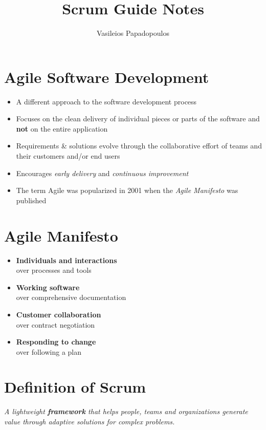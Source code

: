 \documentclass[a4paper,11pt,twocolumn]{article}
\title{\textbf{Scrum Guide Notes} \vspace{-2ex}}
\author{Vasileios Papadopoulos}
\date{}
\begin{document}
\maketitle

\thispagestyle{fancy}

\section*{Agile Software Development}
\begin{itemize}
	\item A different approach to the software development process
	\item Focuses on the clean delivery of individual pieces or parts of the software and \textbf{not} on the entire application
	\item Requirements \& solutions evolve through the collaborative effort of teams and their customers and/or end users
	\item Encourages \textit{early delivery} and \textit{continuous improvement}
	\item The term Agile was popularized in 2001 when the \textit{Agile Manifesto} was published
\end{itemize}

\section*{Agile Manifesto}
\begin{itemize}
	\item \textbf{Individuals and interactions}\\
	over processes and tools
	\item \textbf{Working software}\\
	over comprehensive documentation
	\item \textbf{Customer collaboration}\\
	over contract negotiation
	\item \textbf{Responding to change}\\
	over following a plan
\end{itemize}

\section*{Definition of Scrum}
\textit{A lightweight \textbf{framework} that helps people, teams and organizations generate value through adaptive solutions for complex problems.}
\end{document}
